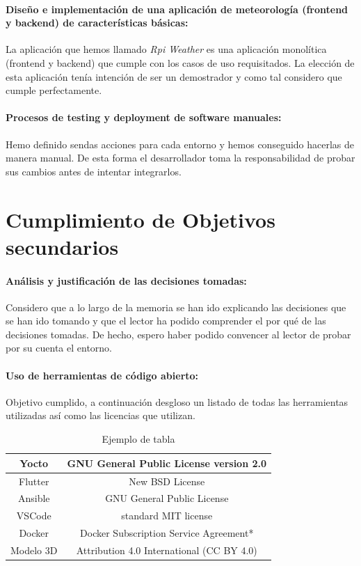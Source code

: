 \paragraph{\checkmark Diseño e implementación de una aplicación de meteorología (frontend y
backend) de características básicas:} La aplicación que hemos llamado \emph{Rpi Weather}
es una aplicación monolítica (frontend y backend) que cumple con los casos de uso
requisitados. La elección de esta aplicación tenía intención de ser un demostrador y
como tal considero que cumple perfectamente.

\paragraph{\checkmark Procesos de testing y deployment de software manuales:}Hemo definido
sendas acciones para cada entorno y hemos conseguido hacerlas de manera manual. De esta
forma el desarrollador toma la responsabilidad de probar sus cambios antes de intentar
integrarlos.

\section{Cumplimiento de Objetivos secundarios}

\paragraph{\checkmark Análisis y justificación de las decisiones tomadas:}Considero que
a lo largo de la memoria se han ido explicando las decisiones que se han ido tomando y
que el lector ha podido comprender el por qué de las decisiones tomadas. De hecho, espero
haber podido convencer al lector de probar por su cuenta el entorno.

\paragraph{\checkmark Uso de herramientas de código abierto:} Objetivo cumplido, a continuación
desgloso un listado de todas las herramientas utilizadas así como las licencias que
utilizan.

\begin{table}[H]
    \begin{center}
    \begin{tabular}{|c|c|}
    \hline
    Yocto & GNU General Public License version 2.0 \\
    \hline
    Flutter & New BSD License \\
    \hline
    Ansible & GNU General Public License \\
    \hline
    VSCode & standard MIT license \\
    \hline
    Docker &  Docker Subscription Service Agreement* \\
    \hline
    Modelo 3D & Attribution 4.0 International (CC BY 4.0) \\
    \hline
    \end{tabular}
    \end{center}
    \caption{Ejemplo de tabla}\label{tab:table_example}
\end{table}

